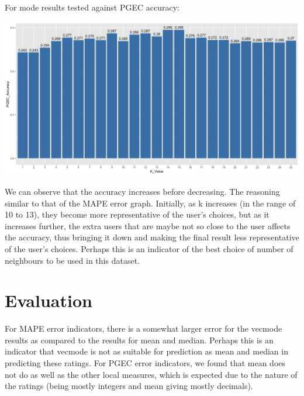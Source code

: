 \documentclass{article}
\begin{document}
For mode results tested against PGEC accuracy:

\includegraphics[scale=0.25]{Vecmode-PGEC.png}

We can observe that the accuracy increases before decreasing. The reasoning similar to that of the MAPE error graph. Initially, as k increases (in the range of 10 to 13), they become more representative of the user's choices, but as it increases further, the extra users that are maybe not so close to the user affects the accuracy, thus bringing it down and making the final result less representative of the user's choices. Perhaps this is an indicator of the best choice of number of neighbours to be used in this dataset.

\section{Evaluation}
For MAPE error indicators, there is a somewhat larger error for the vecmode results as compared to the results for mean and median. Perhaps this is an indicator that vecmode is not as suitable for prediction as mean and median in predicting these ratings. For PGEC error indicators, we found that mean does not do as well as the other local measures, which is expected due to the nature of the ratings (being mostly integers and mean giving mostly decimals).
\end{document}
